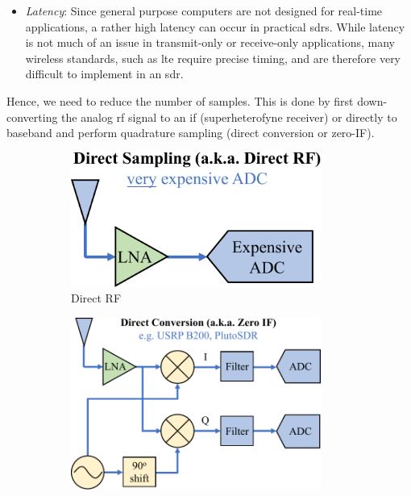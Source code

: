 \begin{itemize}
\item \textit{Latency}: Since general purpose computers are not designed for real-time applications, a rather high latency can occur in practical \glspl{sdr}. While latency is not much of an issue in transmit-only or receive-only applications, many wireless standards, such as \gls{lte} require precise timing, and are therefore very difficult to implement in an \gls{sdr}.
\end{itemize}

Hence, we need to reduce the number of samples. This is done by first down-converting the analog \gls{rf} signal to an \acrlong{if} (superheterofyne receiver) or directly to baseband and perform quadrature sampling  (direct conversion or zero-IF). 

\begin{figure}[hbtp]
    \centering
    \begin{subfigure}[b]{0.32\textwidth}
         \centering
         \includegraphics[width=0.9\textwidth]{figs/direct-rf.pdf}
         \caption{Direct RF}
         \label{fig:direct-rf}
     \end{subfigure}
     \hfill
     \begin{subfigure}[b]{0.32\textwidth}
         \centering
         \includegraphics[width=0.9\textwidth]{figs/zero-if.pdf}

\end{subfigure}
\end{figure}
